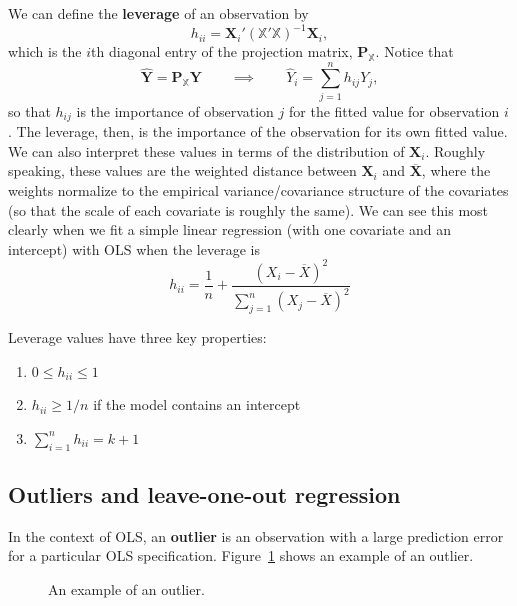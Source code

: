 \documentclass[
  13pt,
  letterpaper,
  DIV=11,
  numbers=noendperiod]{scrreprt}
\providecommand{\tightlist}{%
  \setlength{\itemsep}{0pt}\setlength{\parskip}{0pt}}\usepackage{longtable,booktabs,array}
\newcommand{\mb}{\symbf}
\newcommand{\X}{\mb{X}}
\newcommand{\Xmat}{\mathbb{X}}
\theoremstyle{definition}
\theoremstyle{definition}
\theoremstyle{plain}
\theoremstyle{remark}
\begin{document}
We can define the \textbf{leverage} of an observation by \[ 
h_{ii} = \X_{i}'\left(\Xmat'\Xmat\right)^{-1}\X_{i},
\] which is the \(i\)th diagonal entry of the projection matrix,
\(\mb{P}_{\Xmat}\). Notice that \[ 
\widehat{\mb{Y}} = \mb{P}_{\Xmat}\mb{Y} \qquad \implies \qquad \widehat{Y}_i = \sum_{j=1}^n h_{ij}Y_j,
\] so that \(h_{ij}\) is the importance of observation \(j\) for the
fitted value for observation \(i\). The leverage, then, is the
importance of the observation for its own fitted value. We can also
interpret these values in terms of the distribution of \(\X_{i}\).
Roughly speaking, these values are the weighted distance between
\(\X_i\) and \(\overline{\X}\), where the weights normalize to the
empirical variance/covariance structure of the covariates (so that the
scale of each covariate is roughly the same). We can see this most
clearly when we fit a simple linear regression (with one covariate and
an intercept) with OLS when the leverage is \[ 
h_{ii} = \frac{1}{n} + \frac{(X_i - \overline{X})^2}{\sum_{j=1}^n (X_j - \overline{X})^2}
\]

Leverage values have three key properties:

\begin{enumerate}
\def\labelenumi{\arabic{enumi}.}
\tightlist
\item
  \(0 \leq h_{ii} \leq 1\)
\item
  \(h_{ii} \geq 1/n\) if the model contains an intercept
\item
  \(\sum_{i=1}^{n} h_{ii} = k + 1\)
\end{enumerate}

\subsection{Outliers and leave-one-out
regression}\label{outliers-and-leave-one-out-regression}

In the context of OLS, an \textbf{outlier} is an observation with a
large prediction error for a particular OLS specification.
Figure~\ref{fig-outlier} shows an example of an outlier.

\begin{figure}[th]


\caption{\label{fig-outlier}An example of an outlier.}

\end{figure}%
\end{document}
